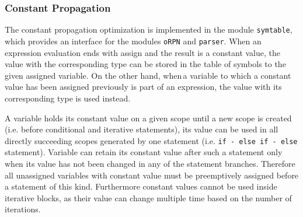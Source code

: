 \documentclass[12pt]{article}
\begin{document}
\subsubsection{Constant Propagation}
The constant propagation optimization is implemented in the module \texttt{symtable}, which provides an interface for the modules \texttt{oRPN} and \texttt{parser}. When an expression evaluation ends with assign and the result is a constant value, the value with the corresponding type can be stored in the table of symbols to the given assigned variable. On the other hand, when\,a variable to which a constant value has been assigned previously is part of an expression, the value with its corresponding type is used instead. \par
A variable holds its constant value on a given scope until a new scope is created (i.e. before conditional and iterative statements), its value can be used in all directly succeeding scopes generated by one statement (i.e. \texttt{if - else if - else} statement). Variable can retain its constant value after such a statement only when its value has not been changed in any of the statement branches. Therefore all unassigned variables with constant value must be preemptively assigned before a statement of this kind. Furthermore constant values cannot be used inside iterative blocks, as their value can change multiple time based on the number of iterations.
\end{document}
